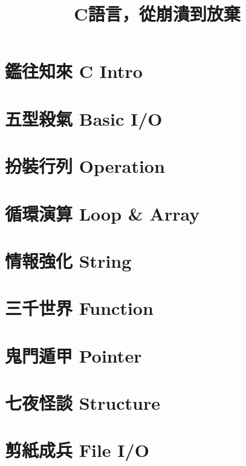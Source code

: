 \documentclass[12pt,a4paper]{book}
\title{C語言，從崩潰到放棄}
\begin{document}
\chapter{鑑往知來 C Intro}
\chapter{五型殺氣 Basic I/O}
\chapter{扮裝行列 Operation}
\chapter{循環演算 Loop \& Array}
\chapter{情報強化 String}
\chapter{三千世界 Function}
\chapter{鬼門遁甲 Pointer}
\chapter{七夜怪談 Structure}
\chapter{剪紙成兵 File I/O}
\end{document}
